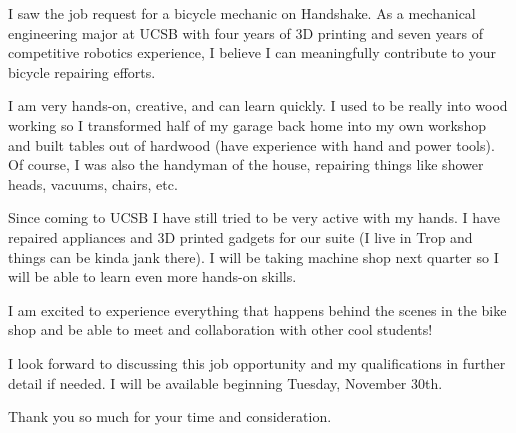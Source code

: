 \documentclass[11pt, letterpaper]{awesome-cv} %
\begin{document}
\makecvheader %

\makelettertitle %


\begin{cvletter}


I saw the job request for a bicycle mechanic on Handshake. As a mechanical engineering major at UCSB with four years of 3D printing and seven years of competitive robotics experience, I believe I can meaningfully contribute to your bicycle repairing efforts.


I am very hands-on, creative, and can learn quickly. I used to be really into wood working so I transformed half of my garage back home into my own workshop and built tables out of hardwood (have experience with hand and power tools). Of course, I was also the handyman of the house, repairing things like shower heads, vacuums, chairs, etc.



Since coming to UCSB I have still tried to be very active with my hands. I have repaired appliances and 3D printed gadgets for our suite (I live in Trop and things can be kinda jank there). I will be taking machine shop next quarter so I will be able to learn even more hands-on skills. 

I am excited to experience everything that happens behind the scenes in the bike shop and be able to meet and collaboration with other cool students!

I look forward to discussing this job opportunity and my qualifications in further detail if needed. I will be available beginning Tuesday, November 30th. 

Thank you so much for your time and consideration.


\end{cvletter}


\makeletterclosing %
\end{document}

